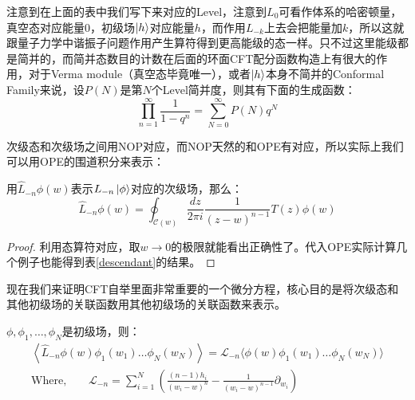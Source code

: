 注意到在上面的表中我们写下来对应的Level，注意到$L_0$可看作体系的哈密顿量，真空态对应能量0，初级场$\ket{h}$对应能量$h$，而作用$L_{-k}$上去会把能量加$k$，所以这就跟量子力学中谐振子问题作用产生算符得到更高能级的态一样。只不过这里能级都是简并的，而简并态数目的计数在后面的环面CFT配分函数构造上有很大的作用，对于Verma module（真空态毕竟唯一），或者$\ket{h}$本身不简并的Conformal Family来说，设$P(N)$是第$N$个Level简并度，则其有下面的生成函数：
\begin{equation}
	\boxed{
		\prod_{n=1}^\infty\frac1{1-q^n}=\sum_{N=0}^\infty P(N)q^N
	}
\end{equation}

次级态和次级场之间用NOP对应，而NOP天然的和OPE有对应，所以实际上我们可以用OPE的围道积分来表示：
\begin{theorem}
	用$\widehat{L}_{-n}\phi(w)$表示$L_{-n}\ket\phi$对应的次级场，那么：
	\begin{equation}\label{eq:33.30}
		\boxed{
			\widehat{L}_{-n}\phi(w)=\oint_{\mathcal{C}(w)}\frac{dz}{2\pi i}\frac1{(z-w)^{n-1}}T(z)\phi(w)
		}
	\end{equation}
\end{theorem}
\begin{proof}
	利用态算符对应，取$w\to 0$的极限就能看出正确性了。代入OPE实际计算几个例子也能得到表\ref{descendant}的结果。
\end{proof}
现在我们来证明CFT自举里面非常重要的一个微分方程，核心目的是将次级态和其他初级场的关联函数用其他初级场的关联函数来表示。
\begin{theorem}
	$\phi,\phi_1,\ldots,\phi_N$是初级场，则：
	\begin{equation}\label{33.31}
		\boxed{
			\begin{gathered}
				\left\langle\widehat{L}_{-n}\phi(w)\phi_{1}(w_{1})\ldots\phi_{N}(w_{N})\right\rangle=\mathcal{L}_{-n}\langle\phi(w)\phi_{1}(w_{1})\ldots\phi_{N}(w_{N})\rangle  \\
				\text{Where,}\qquad\mathcal{L}_{-n}=\sum_{i=1}^N\left(\frac{(n-1)h_i}{(w_i-w)^n}-\frac1{(w_i-w)^{n-1}}\partial_{w_i}\right)
			\end{gathered}
		}
	\end{equation}
\end{theorem}
